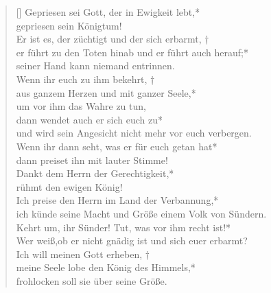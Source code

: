 \begin{verse}[\versewidth]
 Gepriesen sei Gott, der in Ewigkeit lebt,*\\
gepriesen sein Königtum!\\
\vin Er ist es, der züchtigt und der sich erbarmt, †\\
\vin er führt zu den Toten hinab und er führt auch herauf;*\\
\vin seiner Hand kann niemand entrinnen.\\
Wenn ihr euch zu ihm bekehrt, †\\
aus ganzem Herzen und mit ganzer Seele,*\\
um vor ihm das Wahre zu tun,\\
\vin dann wendet auch er sich euch zu*\\
\vin und wird sein Angesicht nicht mehr vor euch verbergen.\\
Wenn ihr dann seht, was er für euch getan hat*\\
dann preiset ihn mit lauter Stimme!\\
\vin Dankt dem Herrn der Gerechtigkeit,*\\
\vin rühmt den ewigen König!\\
Ich preise den Herrn im Land der Verbannung,*\\
ich künde seine Macht und Größe einem Volk von Sündern.\\
\vin Kehrt um, ihr Sünder! Tut, was vor ihm recht ist!*\\
\vin Wer weiß,ob er nicht gnädig ist und sich euer erbarmt?\\


Ich will meinen Gott erheben, †\\
meine Seele lobe den König des Himmels,*\\
frohlocken soll sie über seine Größe.\\

\end{verse}

\vspace{0.6cm}


